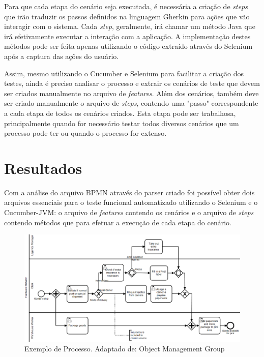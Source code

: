 \documentclass[12pt]{article}
\begin{document}
Para que cada etapa do cenário seja executada, é necessária a criação de \emph{steps} que irão traduzir os passos definidos na linguagem Gherkin para ações que vão interagir com o sistema. Cada \emph{step}, geralmente, irá chamar um método Java que irá efetivamente executar a interação com a aplicação. A implementação destes métodos pode ser feita apenas utilizando o código extraído através do Selenium após a captura das ações do usuário.

Assim, mesmo utilizando o Cucumber e Selenium para facilitar a criação dos testes, ainda é preciso analisar o processo e extrair os cenários de teste que devem ser criados manualmente no arquivo de \emph{features}. Além dos cenários, também deve ser criado manualmente o arquivo de \emph{steps}, contendo uma "passo" correspondente a cada etapa de todos os cenários criados. Esta etapa pode ser trabalhosa, principalmente quando for necessário testar todos diversos cenários que um processo pode ter ou quando o processo for extenso.



\section{Resultados}
Com a análise do arquivo BPMN através do parser criado foi possível obter dois arquivos essenciais para o teste funcional automatizado utilizando o Selenium e o Cucumber-JVM: o arquivo de \emph{features} contendo os cenários e o arquivo de \emph{steps} contendo métodos que para efetuar a execução de cada etapa do cenário. 

\begin{figure}[ht]
\includegraphics[width=.8\paperwidth]{figuras/diagrama_exemplo.png}
\caption{Exemplo de Processo. Adaptado de: Object Management Group}
\label{fig:diagrama_exemplo}
\end{figure}
\end{document}
